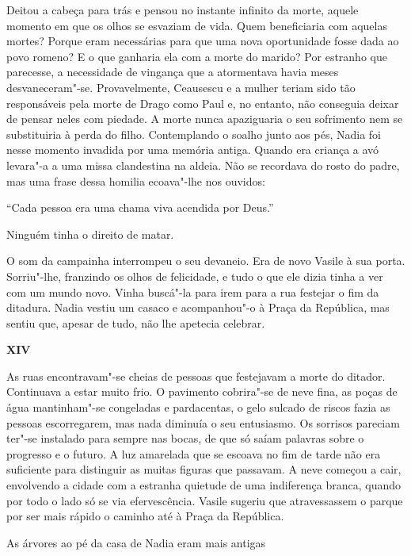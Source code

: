 Deitou a cabeça para trás e pensou no instante infinito da morte, aquele
momento em que os olhos se esvaziam de vida. Quem beneficiaria com
aquelas mortes? Porque eram necessárias para que uma nova oportunidade
fosse dada ao povo romeno? E o que ganharia ela com a morte do marido?
Por estranho que parecesse, a necessidade de vingança que a atormentava
havia meses desvaneceram"-se. Provavelmente, Ceausescu e a mulher teriam
sido tão responsáveis pela morte de Drago como Paul e, no entanto, não
conseguia deixar de pensar neles com piedade. A morte nunca apaziguaria
o seu sofrimento nem se substituiria à perda do filho. Contemplando o
soalho junto aos pés, Nadia foi nesse momento invadida por uma memória
antiga. Quando era criança a avó levara"-a a uma missa clandestina na
aldeia. Não se recordava do rosto do padre, mas uma frase dessa homilia
ecoava"-lhe nos ouvidos:

``Cada pessoa era uma chama viva acendida por Deus.''

Ninguém tinha o direito de matar.

O som da campainha interrompeu o seu devaneio. Era de novo Vasile à sua
porta. Sorriu"-lhe, franzindo os olhos de felicidade, e tudo o que ele
dizia tinha a ver com um mundo novo. Vinha buscá"-la para irem para a rua
festejar o fim da ditadura. Nadia vestiu um casaco e acompanhou"-o à
Praça da República, mas sentiu que, apesar de tudo, não lhe apetecia
celebrar.

\pagebreak
\vspace*{1.8cm}
\noindent{}\textbf{XIV}

\bigskip

As ruas encontravam"-se cheias de pessoas que festejavam a morte do
ditador. Continuava a estar muito frio. O pavimento cobrira"-se de neve
fina, as poças de água mantinham"-se congeladas e pardacentas, o gelo
sulcado de riscos fazia as pessoas escorregarem, mas nada diminuía o seu
entusiasmo. Os sorrisos pareciam ter"-se instalado para sempre nas bocas,
de que só saíam palavras sobre o progresso e o futuro. A luz amarelada
que se escoava no fim de tarde não era suficiente para distinguir as
muitas figuras que passavam. A neve começou a cair, envolvendo a cidade
com a estranha quietude de uma indiferença branca, quando por todo o
lado só se via efervescência. Vasile sugeriu que atravessassem o parque
por ser mais rápido o caminho até à Praça da República.

As árvores ao pé da casa de Nadia eram mais antigas

